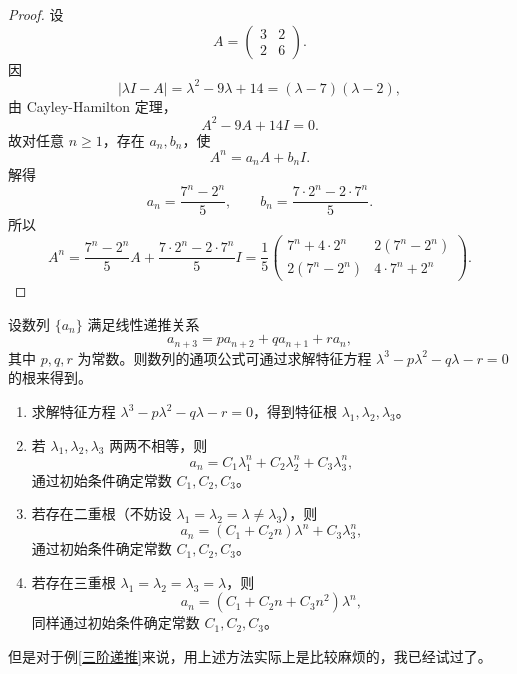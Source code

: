 \begin{proof}
设
\[
A=\begin{pmatrix}3&2\\2&6\end{pmatrix}.
\]
因
\[
|\lambda I-A|=\lambda^2-9\lambda+14=(\lambda-7)(\lambda-2),
\]
由 Cayley-Hamilton 定理，
\[
A^2-9A+14I=0.
\]
故对任意 \(n\ge1\)，存在 \(a_n,b_n\)，使
\[
A^n=a_nA+b_nI.
\]
解得
\[
a_n=\frac{7^n-2^n}{5},\qquad
b_n=\frac{7\cdot 2^n-2\cdot 7^n}{5}.
\]
所以
\[
A^n=
\frac{7^n-2^n}{5}A+\frac{7\cdot 2^n-2\cdot 7^n}{5}I
=
\frac15
\begin{pmatrix}
7^n+4\cdot 2^n & 2(7^n-2^n)\\
2(7^n-2^n) & 4\cdot 7^n+2^n
\end{pmatrix}.
\]
\end{proof}


\begin{lemma} 
设数列 \(\{a_n\}\) 满足线性递推关系
\[
a_{n+3} = p a_{n+2} + q a_{n+1} + r a_n,
\]
其中 $p, q, r$ 为常数。则数列的通项公式可通过求解特征方程 $\lambda^3 - p\lambda^2 - q\lambda - r = 0$ 的根来得到。
\begin{enumerate}[label=step~\arabic*]
\item 求解特征方程 $\lambda^3 - p\lambda^2 - q\lambda - r = 0$，得到特征根 $\lambda_1, \lambda_2, \lambda_3$。
\item 若 $\lambda_1, \lambda_2, \lambda_3$ 两两不相等，则
\[
a_n = C_1 \lambda_1^n + C_2 \lambda_2^n + C_3 \lambda_3^n,
\]
通过初始条件确定常数 $C_1, C_2, C_3$。
\item 若存在二重根（不妨设 $\lambda_1 = \lambda_2 = \lambda \neq \lambda_3$），则
\[
a_n = (C_1 + C_2 n)\lambda^n + C_3 \lambda_3^n,
\]
通过初始条件确定常数 $C_1, C_2, C_3$。
\item 若存在三重根 $\lambda_1 = \lambda_2 = \lambda_3 = \lambda$，则
\[
a_n = (C_1 + C_2 n + C_3 n^2)\lambda^n,
\]
同样通过初始条件确定常数 $C_1, C_2, C_3$。
\end{enumerate}
\end{lemma}


\begin{remark}
但是对于例\ref{三阶递推}来说，用上述方法实际上是比较麻烦的，我已经试过了。
\end{remark}


\vspace{2mm}

